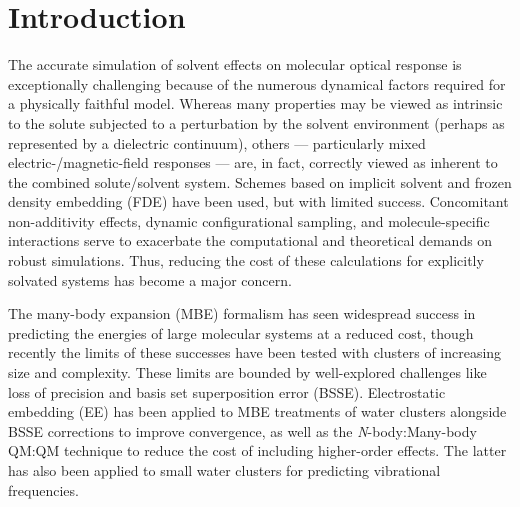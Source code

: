 \section{Introduction} \label{se:introp1}

The accurate simulation of solvent effects on molecular optical response is exceptionally challenging because of the numerous dynamical factors required for a physically faithful model.\cite{Tomasi94,Gao96,Cramer99,Tomasi02, Mennucci02, Mukhopadhyay2006,Mukhopadhyay2007,Lipparini2013,Egidi18} Whereas many properties may be viewed as intrinsic to the solute subjected to a perturbation by the solvent environment (perhaps as represented by a dielectric continuum), others --- particularly mixed electric-/magnetic-field responses\cite{Barron2004,Ruud05:review,Crawford2006,Crawford2007,Crawford12:review,Crawford2018} --- are, in fact, correctly viewed as inherent to the combined solute/solvent system.  Schemes based on implicit solvent\cite{Mennucci02,Kongsted05,Kongsted06,Howard2018a} and frozen density embedding (FDE)\cite{Govind98,Neugebauer05:FDE,Jacob07:FDE,Gomes08,Crawford2015a} have been used, but with limited success.  Concomitant non-additivity effects, dynamic configurational sampling, and molecule-specific interactions serve to exacerbate the computational and theoretical demands on robust simulations.\cite{Mukhopadhyay2006,Mukhopadhyay2007} Thus, reducing the cost of these calculations for explicitly solvated systems has become a major concern.\cite{Crawford2010,McAlexander2016,Kumar2017,Howard2018a}

The many-body expansion (MBE) formalism has seen widespread success in predicting the energies of large molecular systems at a reduced cost, though recently the limits of these successes have been tested with clusters of increasing size and complexity.\cite{Ouyang2014,Richard2014,Ouyang2016,Richard2018a} These limits are bounded by well-explored challenges like loss of precision\cite{Richard2014,Liu2017a,Richard2018a} and basis set superposition error (BSSE).\cite{Boys1970,Wells1983,Valiron1997,Salvador2003,Kamiya2008,Richard2013,Ouyang2014,Ouyang2015,Liu2017a,Mayer2017,Richard2018a} Electrostatic embedding (EE) has been applied to MBE treatments of water clusters alongside BSSE corrections to improve convergence\cite{Richard2013}, as well as the \textit{N}-body:Many-body QM:QM technique\cite{hopkins2003a} to reduce the cost of including higher-order effects. The latter has also been applied to small water clusters for predicting vibrational frequencies.\cite{Howard2013}
    
